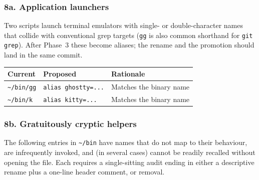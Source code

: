 \documentclass[11pt,letterpaper]{scrartcl}
\begin{document}
\subsubsection*{8a. Application launchers}

Two scripts launch terminal emulators with single- or
double-character names that collide with conventional grep
targets (\texttt{gg} is also common shorthand for
\texttt{git grep}). After Phase~3 these become aliases; the
rename and the promotion should land in the same commit.

\begin{longtable}{@{}llp{2.7in}@{}}
  \toprule
  \textbf{Current} & \textbf{Proposed} & \textbf{Rationale} \\
  \midrule
  \texttt{\textasciitilde/bin/gg} & \texttt{alias ghostty=...} & Matches the binary name \\
  \texttt{\textasciitilde/bin/k}  & \texttt{alias kitty=...}   & Matches the binary name \\
  \bottomrule
\end{longtable}

\subsubsection*{8b. Gratuitously cryptic helpers}

The following entries in \texttt{\textasciitilde/bin} have names
that do not map to their behaviour, are infrequently invoked,
and (in several cases) cannot be readily recalled without
opening the file. Each requires a single-sitting audit ending in
either a descriptive rename plus a one-line header comment, or
removal.
\end{document}
